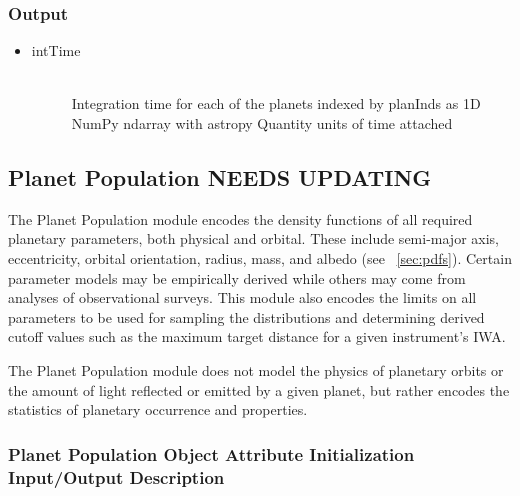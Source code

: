 \documentclass[cleanfoot]{asme2ej}
\begin{document}
\subsubsection*{Output}
\begin{itemize}
    \item 
    \begin{description}
        \item[intTime] \hfill \\
        Integration time for each of the planets indexed by planInds as 1D NumPy ndarray with astropy Quantity units of time attached 
    \end{description}
\end{itemize}


\subsection{Planet Population NEEDS UPDATING}
The Planet Population module encodes the density functions of all required planetary parameters, both physical and orbital. These include semi-major axis, eccentricity, orbital orientation, radius, mass, and albedo (see ~\ref{sec:pdfs}). Certain parameter models may be empirically derived while others may come from analyses of observational surveys.  This module also encodes the limits on all parameters to be used for sampling the distributions and determining derived cutoff values such as the maximum target distance for a given instrument's IWA.

The Planet Population module does not model the physics of planetary orbits or the amount of light reflected or emitted by a given planet, but rather encodes the statistics of planetary occurrence and properties. 

\label{sec:planetpopulation}
\subsubsection{Planet Population Object Attribute Initialization Input/Output Description} 
\end{document}
